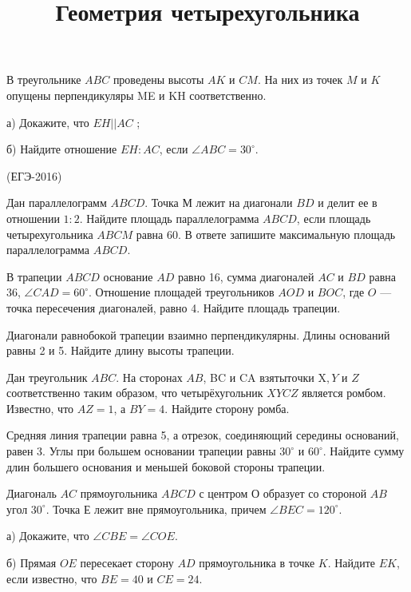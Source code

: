 \documentclass[c,12pt]{beamer}  %
\begin{document}
	\begin{frame}
		\begin{block}{}
			В треугольнике $ ABC $ проведены высоты $ AK $ и $ CM $. На них из	точек $ M $ и $ K $ опущены перпендикуляры ME и KH соответственно.
			
			а) Докажите, что $ EH || AC $ ;
			
			б) Найдите отношение $ EH : AC $, если $\angle ABC= 30^\circ $.
			
			(ЕГЭ-2016)
		\end{block}
	\end{frame}

	\title{Геометрия четырехугольника}
	\frame[plain]{\titlepage}	%
	
	\begin{frame}
		\begin{block}{}
			Дан параллелограмм $ ABCD $. Точка $ М $ лежит на диагонали $ BD $ и делит ее в отношении $ 1 : 2 $. Найдите площадь параллелограмма $ ABCD $, если площадь четырехугольника $ ABCM $ равна 60. В ответе запишите максимальную площадь параллелограмма $ ABCD $.
		\end{block}
		\begin{block}{}
			В трапеции $ ABCD $ основание $ AD $ равно 16, сумма диагоналей $ AC $ и $ BD $ равна 36, $\angle CAD = 60^\circ $. Отношение площадей треугольников $ AOD $ и $ BOC $, где $ O $ — точка пересечения диагоналей, равно 4. Найдите площадь трапеции.
		\end{block}
		\begin{block}{}
			Диагонали равнобокой трапеции взаимно перпендикулярны. Длины оснований равны 2 и 5. Найдите длину высоты трапеции.
		\end{block}
	\end{frame}
	\begin{frame}
		\begin{block}{}
			Дан треугольник $ ABC $. На сторонах $ AB$, BC $ и $ CA $ взяты точки $ X$, Y $ и $ Z $ соответственно таким образом, что четырёхугольник $ XYCZ $ является ромбом. Известно, что $ AZ =1 $, а $ BY = 4 $. Найдите сторону ромба.
		\end{block}		
		\begin{block}{}
			Средняя линия трапеции равна 5, а отрезок, соединяющий середины оснований, равен 3.			
			Углы при большем основании трапеции равны $ 30^\circ $ и $ 60^\circ $. Найдите сумму длин большего основания и меньшей боковой стороны трапеции.
		\end{block}
		
		\begin{block}{}
			Диагональ $ AC $ прямоугольника $ ABCD $ с центром $ О $ образует со стороной $ AB $ угол $ 30^\circ $. Точка $ Е $ лежит вне прямоугольника, причем $ \angle BEC = 120^\circ$.
			
			а)	Докажите, что $\angle CBE = \angle COE$.
			
			б)	Прямая $ OE $ пересекает сторону $ AD $ прямоугольника в точке $ K $. Найдите $ EK $, если известно, что $  BE = 40 $ и $ CE = 24 $.
		\end{block}		
	\end{frame}
\end{document}
